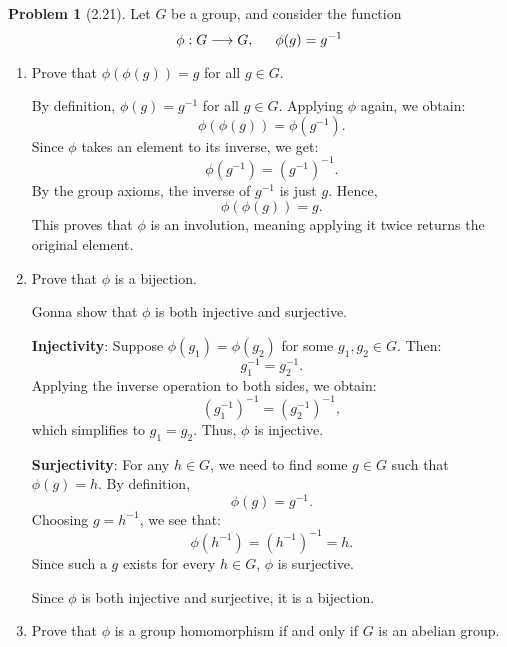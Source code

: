 \documentclass[12pt]{article}
\theoremstyle{definition}
\newtheorem{problem}{Problem}
\begin{document}
\begin{problem}[2.21]
    Let $G$ be a group, and consider the function
    \[\phi: G \longrightarrow G, \hspace{15px} \phi(g) = g^{-1}\]
    \begin{enumerate}[label=(\alph*)]
        \item Prove that $\phi(\phi(g)) = g$ for all $g \in G$.
        
        \begin{solution}
            By definition, $\phi(g) = g^{-1}$ for all $g \in G$. Applying $\phi$ again, we obtain:
            \[
            \phi(\phi(g)) = \phi(g^{-1}).
            \]
            Since $\phi$ takes an element to its inverse, we get:
            \[
            \phi(g^{-1}) = (g^{-1})^{-1}.
            \]
            By the group axioms, the inverse of $g^{-1}$ is just $g$. Hence,
            \[
            \phi(\phi(g)) = g.
            \]
            This proves that $\phi$ is an involution, meaning applying it twice returns the original element.
        
        \end{solution}
        \item Prove that $\phi$ is a bijection.
        
        \begin{solution}
            Gonna show that $\phi$ is both injective and surjective.

            \textbf{Injectivity}: Suppose $\phi(g_1) = \phi(g_2)$ for some $g_1, g_2 \in G$. Then:
            \[
            g_1^{-1} = g_2^{-1}.
            \]
            Applying the inverse operation to both sides, we obtain:
            \[
            (g_1^{-1})^{-1} = (g_2^{-1})^{-1},
            \]
            which simplifies to $g_1 = g_2$. Thus, $\phi$ is injective.
    
            \textbf{Surjectivity}: For any $h \in G$, we need to find some $g \in G$ such that $\phi(g) = h$. By definition, 
            \[
            \phi(g) = g^{-1}.
            \]
            Choosing $g = h^{-1}$, we see that:
            \[
            \phi(h^{-1}) = (h^{-1})^{-1} = h.
            \]
            Since such a $g$ exists for every $h \in G$, $\phi$ is surjective.
    
            Since $\phi$ is both injective and surjective, it is a bijection.
            
        \end{solution}
        \item Prove that $\phi$ is a group homomorphism if and only if $G$ is an abelian group.
        

\end{enumerate}
\end{problem}
\end{document}
